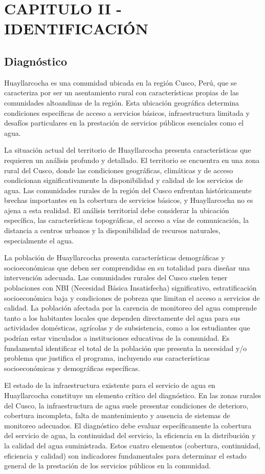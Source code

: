 \chapter{CAPITULO II - IDENTIFICACIÓN}

\section{Diagnóstico}

Huayllarcocha es una comunidad ubicada en la región Cusco, Perú, que se caracteriza por ser un asentamiento rural con características propias de las comunidades altoandinas de la región. Esta ubicación geográfica determina condiciones específicas de acceso a servicios básicos, infraestructura limitada y desafíos particulares en la prestación de servicios públicos esenciales como el agua.


La situación actual del territorio de Huayllarcocha presenta características que requieren un análisis profundo y detallado. El territorio se encuentra en una zona rural del Cusco, donde las condiciones geográficas, climáticas y de acceso condicionan significativamente la disponibilidad y calidad de los servicios de agua. Las comunidades rurales de la región del Cusco enfrentan históricamente brechas importantes en la cobertura de servicios básicos, y Huayllarcocha no es ajena a esta realidad. El análisis territorial debe considerar la ubicación específica, las características topográficas, el acceso a vías de comunicación, la distancia a centros urbanos y la disponibilidad de recursos naturales, especialmente el agua.


La población de Huayllarcocha presenta características demográficas y socioeconómicas que deben ser comprendidas en su totalidad para diseñar una intervención adecuada. Las comunidades rurales del Cusco suelen tener poblaciones con NBI (Necesidad Básica Insatisfecha) significativo, estratificación socioeconómica baja y condiciones de pobreza que limitan el acceso a servicios de calidad. La población afectada por la carencia de monitoreo del agua comprende tanto a los habitantes locales que dependen directamente del agua para sus actividades domésticas, agrícolas y de subsistencia, como a los estudiantes que podrían estar vinculados a instituciones educativas de la comunidad. Es fundamental identificar el total de la población que presenta la necesidad y/o problema que justifica el programa, incluyendo sus características socioeconómicas y demográficas específicas.

El estado de la infraestructura existente para el servicio de agua en Huayllarcocha constituye un elemento crítico del diagnóstico. En las zonas rurales del Cusco, la infraestructura de agua suele presentar condiciones de deterioro, cobertura incompleta, falta de mantenimiento y ausencia de sistemas de monitoreo adecuados. El diagnóstico debe evaluar específicamente la cobertura del servicio de agua, la continuidad del servicio, la eficiencia en la distribución y la calidad del agua suministrada. Estos cuatro elementos (cobertura, continuidad, eficiencia y calidad) son indicadores fundamentales para determinar el estado general de la prestación de los servicios públicos en la comunidad.

